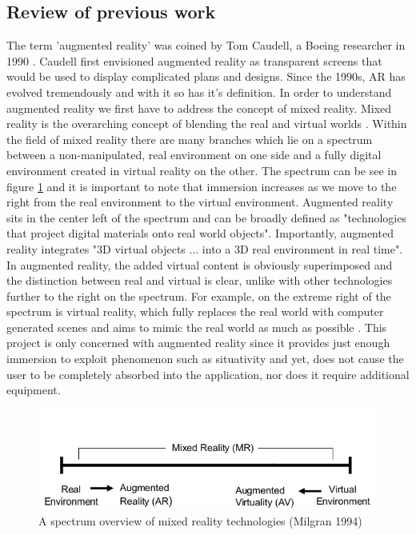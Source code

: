 \documentclass{l4proj}
\begin{document}
\subsection{Review of previous work} \label{sec:litrew}
The term 'augmented reality' was coined by Tom Caudell, a Boeing researcher in 1990 \cite{rauterberg_history_2002}. Caudell first envisioned augmented reality as transparent screens that would be used to display complicated plans and designs. Since the 1990s, AR has evolved tremendously and with it so has it's definition. In order to understand augmented reality we first have to address the concept of mixed reality. Mixed reality is the overarching concept of blending the real and virtual worlds \cite{milgram_taxonomy_1994}. Within the field of mixed reality there are many branches which lie on a spectrum between a non-manipulated, real environment on one side and a fully digital environment created in virtual reality on the other. The spectrum can be see in figure \ref{fig:ar-spectrum} and it is important to note that immersion increases as we move to the right from the real environment to the virtual environment. Augmented reality sits in the center left of the spectrum and can be broadly defined as "technologies that project digital materials onto real world objects"\cite{cuendet_designing_2013}. Importantly, augmented reality integrates "3D virtual objects ... into a 3D real environment in real time"\cite{azuma_survey_1997}. In augmented reality, the added virtual content is obviously superimposed and the distinction between real and virtual is clear, unlike with other technologies further to the right on the spectrum. For example, on the extreme right of the spectrum is virtual reality, which fully replaces the real world with computer generated scenes and aims to mimic the real world as much as possible \cite{tamura_mixed_2001}. This project is only concerned with augmented reality since it provides just enough immersion to exploit phenomenon such as situativity and yet, does not cause the user to be completely absorbed into the application, nor does it require additional equipment. 

\begin{figure}[h]
\centering
\includegraphics[scale=1]{images/ar-spectrum.png}
\caption{A spectrum overview of mixed reality technologies (Milgran 1994)}
\label{fig:ar-spectrum}
\end{figure}
\end{document}
